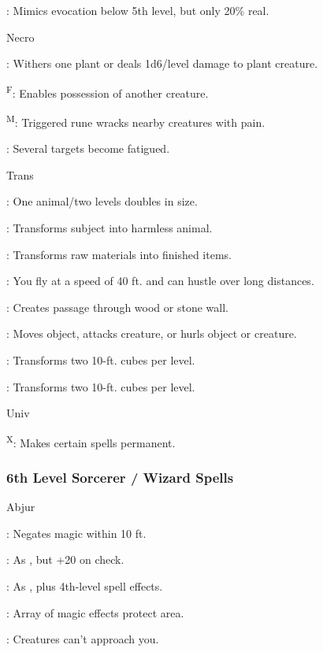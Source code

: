 : Mimics evocation below 5th level, but only 20\% real.

Necro

: Withers one plant or deals 1d6/level damage to plant creature.

\textsuperscript{F}: Enables possession of another creature.

\textsuperscript{M}: Triggered rune wracks nearby creatures with pain.

: Several targets become fatigued.

Trans

: One animal/two levels doubles in size.

: Transforms subject into harmless animal.

: Transforms raw materials into finished items.

: You fly at a speed of 40 ft. and can hustle over long distances.

: Creates passage through wood or stone wall.

: Moves object, attacks creature, or hurls object or creature.

: Transforms two 10-ft. cubes per level.

: Transforms two 10-ft. cubes per level.

Univ

\textsuperscript{X}: Makes certain spells permanent.

\subsubsection{6th Level Sorcerer / Wizard Spells}

Abjur

: Negates magic within 10 ft.

: As , but +20 on check.

: As , plus 4th-level spell effects.

: Array of magic effects protect area.

: Creatures can't approach you.

